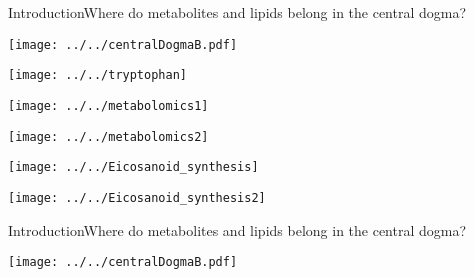 \documentclass[xcolor=dvipsnames]{beamer}
\begin{document}
\begin{frame}{Introduction}{Where do metabolites and lipids belong in the central dogma?}
\vspace{-7 pt}
\begin{center}
	\texttt{[image: ../../centralDogmaB.pdf]}
\end{center}
\addtocounter{framenumber}{-1}
\end{frame}

\begin{frame}
	\vspace{-10.5pt}
	\begin{center}
		\texttt{[image: ../../tryptophan]}
		
	\end{center}
\end{frame}

\begin{frame}
\begin{center}
	\texttt{[image: ../../metabolomics1]}
\end{center}
\addtocounter{framenumber}{-1}
\end{frame}

\begin{frame}
\begin{center}
	\texttt{[image: ../../metabolomics2]}
\end{center}
\addtocounter{framenumber}{-1}
\end{frame}

\begin{frame}
	\begin{center}
		\texttt{[image: ../../Eicosanoid\_synthesis]}
		
	\end{center}
\end{frame}

\begin{frame}
\begin{center}
	\texttt{[image: ../../Eicosanoid\_synthesis2]}
\end{center}
\addtocounter{framenumber}{-1}
\end{frame}

\begin{frame}{Introduction}{Where do metabolites and lipids belong in the central dogma?}
\vspace{-7 pt}
\begin{center}
	\texttt{[image: ../../centralDogmaB.pdf]}
\end{center}
\end{frame}
\end{document}

